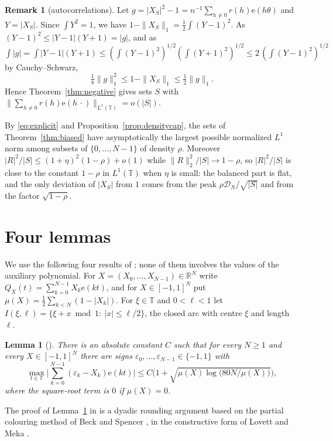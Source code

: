\documentclass[11pt,reqno]{amsart}
\newtheorem{lemma}[theorem]{Lemma}
\theoremstyle{definition}
\newtheorem{remark}[theorem]{Remark}
\newcommand{\T}{\mathbb{T}}
\newcommand{\R}{\mathbb{R}}
\newcommand{\e}{\mathrm{e}}
\newcommand{\cD}{\mathcal{D}}
\begin{document}
\begin{remark}[autocorrelations]
Let $g=|X_S|^2-1=n^{-1}\sum_{h\ne0}r(h)\e(h\theta)$ and $Y=|X_S|$. Since $\int Y^2=1$, we have $1-\|X_S\|_1=\frac12\int(Y-1)^2$. As $(Y-1)^2\le|Y-1|(Y+1)=|g|$, and as $\int|g|=\int|Y-1|(Y+1)\le(\int(Y-1)^2)^{1/2}(\int(Y+1)^2)^{1/2}\le2\,(\int(Y-1)^2)^{1/2}$ by Cauchy--Schwarz,
\begin{equation}\label{eq:autocorr}
\tfrac18\|g\|_1^2\le1-\|X_S\|_1\le\tfrac12\|g\|_1 .
\end{equation}
Hence Theorem~\ref{thm:negative} gives sets $S$ with $\big\|\sum_{h\ne0}r(h)\e(h\,\cdot)\big\|_{L^1(\T)}=o(|S|)$.
\end{remark}

By \eqref{eq:explicit} and Proposition~\ref{prop:densitycap}, the sets of Theorem~\ref{thm:biased} have asymptotically the largest possible normalized $L^1$ norm among subsets of $\{0,\dots,N-1\}$ of density $\rho$. Moreover $|R|^2/|S|\le(1+\eta)^2(1-\rho)+o(1)$ while $\|R\|_2^2/|S|\to1-\rho$, so $|R|^2/|S|$ is close to the constant $1-\rho$ in $L^1(\T)$ when $\eta$ is small: the balanced part is flat, and the only deviation of $|X_S|$ from $1$ comes from the peak $\rho\cD_N/\sqrt{|S|}$ and from the factor $\sqrt{1-\rho}$.

\section{Four lemmas}\label{sec:tools}
We use the following four results of \cite{AMM}; none of them involves the values of the auxiliary polynomial. For $X=(X_0,\dots,X_{N-1})\in\R^N$ write $Q_X(t)=\sum_{k=0}^{N-1}X_k\e(kt)$, and for $X\in[-1,1]^N$ put $\mu(X)=\frac12\sum_{k<N}(1-|X_k|)$. For $\xi\in\T$ and $0<\ell<1$ let $I(\xi,\ell)=\{\xi+x\bmod1:\ |x|\le\ell/2\}$, the closed arc with centre $\xi$ and length $\ell$.

\begin{lemma}[{\cite[Lemma~2.2]{AMM}}]\label{lem:rounding}
There is an absolute constant $C$ such that for every $N\ge1$ and every $X\in[-1,1]^N$ there are signs $\varepsilon_0,\dots,\varepsilon_{N-1}\in\{-1,1\}$ with
\[
\max_{t\in\T}\Big|\sum_{k=0}^{N-1}(\varepsilon_k-X_k)\e(kt)\Big|\le C\Big(1+\sqrt{\mu(X)\log\big(80N/\mu(X)\big)}\Big),
\]
where the square-root term is $0$ if $\mu(X)=0$.
\end{lemma}

The proof of Lemma~\ref{lem:rounding} in \cite{AMM} is a dyadic rounding argument based on the partial colouring method of Beck \cite{Bec81} and Spencer \cite{Spe85}, in the constructive form of Lovett and Meka \cite{LM15}.
\end{document}
